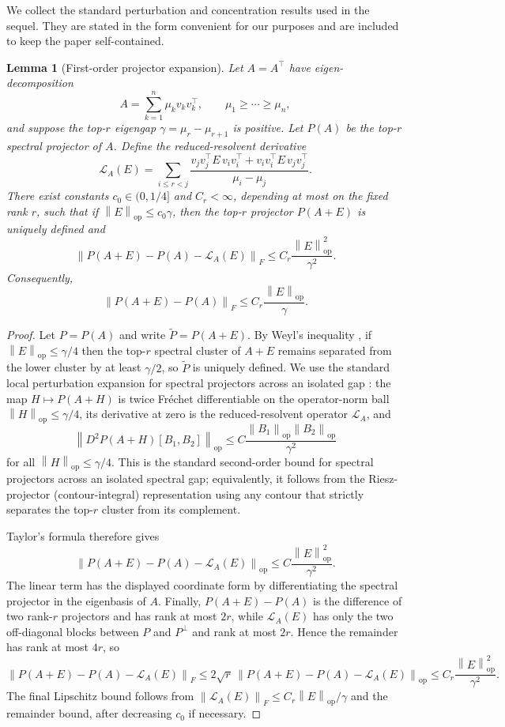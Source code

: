 \documentclass[11pt]{article}
\theoremstyle{tightplain}
\newtheorem{lemma}[theorem]{Lemma}
\theoremstyle{tightdef}
\DeclareMathOperator{\op}{op}
\newcommand{\norm}[1]{\left\lVert #1 \right\rVert}
\begin{document}
We collect the standard perturbation and concentration results used in the
sequel. They are stated in the form convenient for our purposes and are
included to keep the paper self-contained.

\begin{lemma}[First-order projector expansion]\label{lem:projectorexpansion}
Let $A=A^\top$ have eigen-decomposition
\[
A=\sum_{k=1}^n \mu_k v_kv_k^\top,
\qquad
\mu_1\ge\cdots\ge\mu_n,
\]
and suppose the top-$r$ eigengap $\gamma=\mu_r-\mu_{r+1}$ is positive. Let
$P(A)$ be the top-$r$ spectral projector of $A$. Define the reduced-resolvent
derivative
\[
\mathcal L_A(E)
=\sum_{i\le r<j}
\frac{v_j v_j^\top E\, v_i v_i^\top+v_i v_i^\top E\, v_j v_j^\top}{\mu_i-\mu_j}.
\]
There exist constants $c_0\in(0,1/4]$ and $C_r<\infty$, depending at most on the
fixed rank $r$, such that if $\norm{E}_{\op}\le c_0\gamma$, then the top-$r$
projector $P(A+E)$ is uniquely defined and
\[
\norm{P(A+E)-P(A)-\mathcal L_A(E)}_F
\le
C_r\frac{\norm{E}_{\op}^2}{\gamma^2}.
\]
Consequently,
\[
\norm{P(A+E)-P(A)}_F
\le
C_r\frac{\norm{E}_{\op}}{\gamma}.
\]
\end{lemma}

\begin{proof}
Let $P=P(A)$ and write $\widetilde P=P(A+E)$. By Weyl's inequality
\cite[Ch.~III]{Bhatia1997}, if $\norm E_{\op}\le \gamma/4$ then the top-$r$
spectral cluster of $A+E$ remains separated from the lower cluster by at least
$\gamma/2$, so $\widetilde P$ is uniquely defined. We use the standard local
perturbation expansion for spectral projectors across an isolated gap
\cite{Kato1995,DavisKahan1970}: the map $H\mapsto P(A+H)$ is twice Fr\'echet
differentiable on the operator-norm ball $\norm H_{\op}\le\gamma/4$, its
derivative at zero is the reduced-resolvent operator $\mathcal L_A$, and
\[
\norm{D^2P(A+H)[B_1,B_2]}_{\op}
\le
C\frac{\norm{B_1}_{\op}\norm{B_2}_{\op}}{\gamma^2}
\]
for all $\norm H_{\op}\le\gamma/4$. This is the standard second-order bound for
spectral projectors across an isolated spectral gap; equivalently, it follows
from the Riesz-projector (contour-integral) representation
\cite[Ch.~II]{Kato1995} using any contour that strictly separates the top-$r$
cluster from its complement.

Taylor's formula therefore gives
\[
\norm{P(A+E)-P(A)-\mathcal L_A(E)}_{\op}
\le
C\frac{\norm E_{\op}^2}{\gamma^2}.
\]
The linear term has the displayed coordinate form by differentiating the
spectral projector in the eigenbasis of $A$. Finally, $P(A+E)-P(A)$ is the
difference of two rank-$r$ projectors and has rank at most $2r$, while
$\mathcal L_A(E)$ has only the two off-diagonal blocks between $P$ and
$P^\perp$ and rank at most $2r$. Hence the remainder has rank at most $4r$, so
\[
\norm{P(A+E)-P(A)-\mathcal L_A(E)}_F
\le
2\sqrt r\,\norm{P(A+E)-P(A)-\mathcal L_A(E)}_{\op}
\le
C_r\frac{\norm E_{\op}^2}{\gamma^2}.
\]
The final Lipschitz bound follows from
$\norm{\mathcal L_A(E)}_F\le C_r\norm E_{\op}/\gamma$ and the remainder bound,
after decreasing $c_0$ if necessary.
\end{proof}
\end{document}
